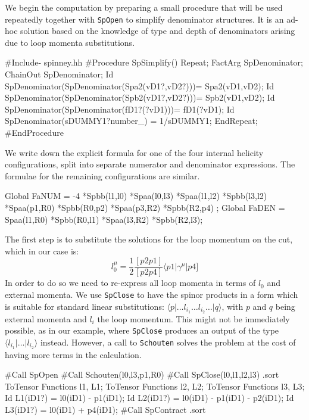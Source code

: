\documentclass[preprint,number,12pt,sort&compress]{elsarticle}
\newcommand{\Spaa}[1]{\langle #1 \rangle}
\newcommand{\Spab}[1]{\langle #1]}
\newcommand{\Spbb}[1]{[ #1 ]}
\begin{document}
We begin the computation by preparing a small procedure that will be used
repeatedly together with \texttt{SpOpen} to simplify denominator structures.
It is an ad-hoc solution based on the knowledge of type and depth of
denominators arising due to loop momenta substitutions.
\begin{spform}
#Include- spinney.hh
#Procedure SpSimplify()
   Repeat;
      FactArg SpDenominator;
      ChainOut SpDenominator;
      Id SpDenominator(SpDenominator(Spa2(vD1?,vD2?)))=
         Spa2(vD1,vD2);
      Id SpDenominator(SpDenominator(Spb2(vD1?,vD2?)))=
         Spb2(vD1,vD2);
      Id SpDenominator(SpDenominator(fD1?(?vD1)))= 
         fD1(?vD1); 
      Id SpDenominator(sDUMMY1?number_) = 1/sDUMMY1;
   EndRepeat;
#EndProcedure
\end{spform}
We write down the explicit formula for one of the four internal
helicity configurations, split into separate numerator and denominator
expressions. The formulae for the remaining configurations are similar.
\begin{spform}
Global FaNUM = -4 *Spbb(l1,l0) *Spaa(l0,l3) *Spaa(l1,l2) 
               *Spbb(l3,l2) *Spaa(p1,R0) *Spbb(R0,p2) 
               *Spaa(p3,R2) *Spbb(R2,p4) ;
Global FaDEN = Spaa(l1,R0) *Spbb(R0,l1) *Spaa(l3,R2) 
               *Spbb(R2,l3);
\end{spform}
The first step is to substitute the solutions for the loop momentum
on the cut, which in our case is:
\begin{equation}
l_0^{\mu} = \frac{1}{2}\frac{\Spbb{p2 p1}}{\Spbb{p2 p4}} 
            \Spab{p1\vert\gamma^{\mu}\vert p4}
\end{equation}
In order to do so we need to re-express all loop momenta in terms of $l_0$
and external momenta. We use \texttt{SpClose} to have the spinor products
in a form which is suitable for standard linear substitutions:
$\Spaa{p \vert \ldots l_{i_1} \ldots l_{i_2}\ldots \vert q}$, 
with $p$ and $q$ being external momenta and $l_i$ the loop momentum.
This might not be immediately possible,
as in our example, where \texttt{SpClose} produces an output of
the type $\Spaa{l_{i_1} \vert\ldots \vert l_{i_2}}$ instead.
However, a call to \texttt{Schouten} solves the problem at the cost of
having more terms in the calculation.
\begin{spform}
#Call SpOpen
#Call Schouten(l0,l3,p1,R0)
#Call SpClose(l0,l1,l2,l3)
.sort
ToTensor Functions l1, L1;
ToTensor Functions l2, L2;
ToTensor Functions l3, L3;
Id L1(iD1?) = l0(iD1) - p1(iD1);
Id L2(iD1?) = l0(iD1) - p1(iD1) - p2(iD1);
Id L3(iD1?) = l0(iD1) + p4(iD1);
#Call SpContract
.sort
\end{spform}
\end{document}
